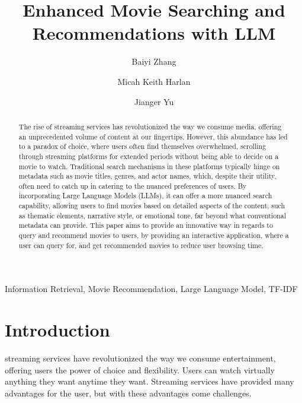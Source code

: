\documentclass[journal]{IEEEtran}
\theoremstyle{mydefstyle}
\begin{document}
\title{Enhanced Movie Searching and Recommendations with LLM}

\author[1]{Baiyi Zhang}
\author[1]{Micah Keith Harlan}
\author[1]{Jianger Yu}



\maketitle

\begin{abstract}
The rise of streaming services has revolutionized the way we consume media, offering an unprecedented volume of content at our fingertips. However, this abundance has led to a paradox of choice, where users often find themselves overwhelmed, scrolling through streaming platforms for extended periods without being able to decide on a movie to watch. Traditional search mechanisms in these platforms typically hinge on metadata such as movie titles, genres, and actor names, which, despite their utility, often need to catch up in catering to the nuanced preferences of users. By incorporating Large Language Models (LLMs), it can offer a more nuanced search capability, allowing users to find movies based on detailed aspects of the content, such as thematic elements, narrative style, or emotional tone, far beyond what conventional metadata can provide. This paper aims to provide an innovative way in regards to query and recommend movies to users, by providing an interactive application, where a user can query for, and get recommended movies to reduce user browsing time.
\end{abstract}

\begin{IEEEkeywords}
Information Retrieval, Movie Recommendation, Large Language Model, TF-IDF
\end{IEEEkeywords}

\section{Introduction}
 streaming services have revolutionized the way we consume entertainment, offering users the power of choice and flexibility. Users can watch virtually anything they want anytime they want. Streaming services have provided many advantages for the user, but with these advantages come challenges. 
\end{document}
